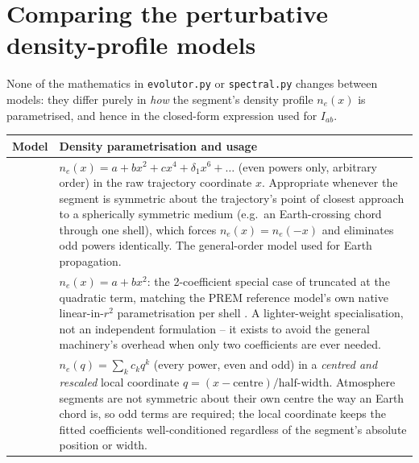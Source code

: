 \section{Comparing the perturbative density-profile models}
\label{sec:perturbative-models}


\begin{implbox}
None of the mathematics in \texttt{evolutor.py} or \texttt{spectral.py}
changes between models: they differ purely in \emph{how} the segment's
density profile $n_e(x)$ is parametrised, and hence in the closed-form
expression used for $I_{ab}$.

\begin{center}
\small
\begin{tabular}{@{}ll@{}}
\toprule
Model & Density parametrisation and usage \\
\midrule
\parbox[t]{3.2cm}{} &
  \parbox[t]{9.4cm}{$n_e(x)=a+bx^2+cx^4+\delta_1x^6+\dots$ (even powers only,
  arbitrary order) in the raw trajectory coordinate $x$. Appropriate
  whenever the segment is symmetric about the trajectory's point of
  closest approach to a spherically symmetric medium (e.g.\ an
  Earth-crossing chord through one shell), which forces $n_e(x)=n_e(-x)$
  and eliminates odd powers identically. The general-order model used for
  Earth propagation.} \\[30pt]
\parbox[t]{3.2cm}{} &
  \parbox[t]{9.4cm}{$n_e(x)=a+bx^2$: the 2-coefficient special case of
   truncated at the quadratic term, matching the PREM
  reference model's own native linear-in-$r^2$ parametrisation per shell
  \parencite{DziewonskiAnderson1981}. A lighter-weight specialisation, not
  an independent formulation -- it exists to avoid the general
   machinery's overhead when only two coefficients are
  ever needed.} \\[30pt]
\parbox[t]{3.2cm}{} &
  \parbox[t]{9.4cm}{$n_e(q)=\sum_kc_kq^k$ (every power, even and odd) in a
  \emph{centred and rescaled} local coordinate $q=(x-\text{centre})/\text{half-width}$.
  Atmosphere segments are not symmetric about their own centre the way an
  Earth chord is, so odd terms are required; the local coordinate keeps the
  fitted coefficients well-conditioned regardless of the segment's absolute
  position or width.} \\[30pt]
\bottomrule
\end{tabular}
\end{center}


\end{implbox}

